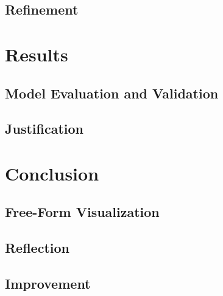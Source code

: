 \documentclass[12pt, letterpaper]{article}
\begin{document}
\subsection{Refinement}

\section{Results}
\subsection{Model Evaluation and Validation}
\subsection{Justification}

\section{Conclusion}
\subsection{Free-Form Visualization}
\subsection{Reflection}
\subsection{Improvement}
\end{document}
